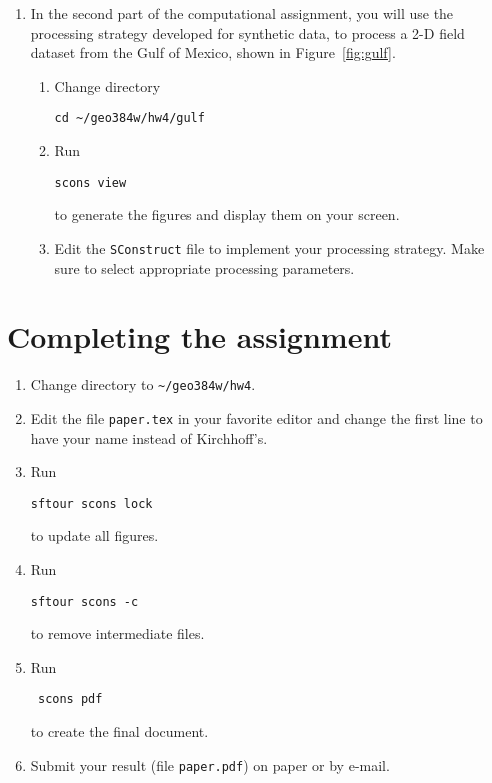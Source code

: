 \begin{enumerate}
\newpage


\item In the second part of the computational assignment, you will use the processing strategy developed for synthetic data, 
to process a 2-D field dataset from the Gulf of Mexico, shown in Figure~\ref{fig:gulf}.

\begin{enumerate}
\item Change directory 
\begin{verbatim}
cd ~/geo384w/hw4/gulf
\end{verbatim}
\item Run
\begin{verbatim}
scons view
\end{verbatim}
to generate the figures and display them on your screen.
\item Edit the \texttt{SConstruct} file to implement your processing strategy. 
Make sure to select appropriate processing parameters.
\end{enumerate}

\lstset{language=python,numbers=left,numberstyle=\tiny,showstringspaces=false}


\end{enumerate}

\section{Completing the assignment}

\begin{enumerate}
\item Change directory to \verb#~/geo384w/hw4#.
\item Edit the file \texttt{paper.tex} in your favorite editor and change the
  first line to have your name instead of Kirchhoff's.
\item Run
\begin{verbatim}
sftour scons lock
\end{verbatim}
to update all figures.
\item Run
\begin{verbatim}
sftour scons -c
\end{verbatim}
to remove intermediate files.
\item Run
 \begin{verbatim} 
 scons pdf
\end{verbatim}
  to create the final document.
\item Submit your result (file \texttt{paper.pdf}) on paper or by
  e-mail. 
\end{enumerate}

